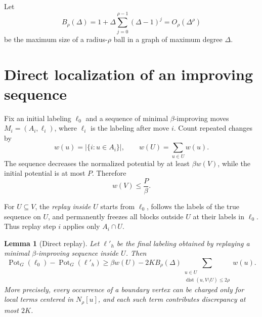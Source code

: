 \documentclass[11pt]{article}
\newtheorem{lemma}[theorem]{Lemma}
\theoremstyle{definition}
\theoremstyle{remark}
\newcommand{\dist}{\operatorname{dist}}
\newcommand{\Pot}{\operatorname{Pot}}
\newcommand{\N}{N}
\begin{document}
Let
\begin{equation}\label{eq:ballsize}
  B_\rho(\Delta)=1+\Delta\sum_{j=0}^{\rho-1}(\Delta-1)^j
  =O_\rho(\Delta^\rho)
\end{equation}
be the maximum size of a radius-$\rho$ ball in a graph of maximum degree $\Delta$.

\section{Direct localization of an improving sequence}

Fix an initial labeling $\ell_0$ and a sequence of minimal $\beta$-improving moves
$M_i=(A_i,\ell_i)$, where $\ell_i$ is the labeling after move $i$.  Count repeated
changes by
\[
  w(u)=|\{i:u\in A_i\}|,
  \qquad w(U)=\sum_{u\in U}w(u).
\]
The sequence decreases the normalized potential by at least $\beta w(V)$, while the
initial potential is at most $P$.  Therefore
\begin{equation}\label{eq:totalmass}
  w(V)\leq \frac{P}{\beta}.
\end{equation}

For $U\subseteq V$, the \emph{replay inside $U$} starts from $\ell_0$, follows the
labels of the true sequence on $U$, and permanently freezes all blocks outside $U$
at their labels in $\ell_0$.  Thus replay step $i$ applies only $A_i\cap U$.

\begin{lemma}[Direct replay]\label{lem:replay}
Let $\ell'_h$ be the final labeling obtained by replaying a minimal
$\beta$-improving sequence inside $U$.  Then
\[
 \Pot_G(\ell_0)-\Pot_G(\ell'_h)
 \geq
 \beta w(U)-2K B_\rho(\Delta)
 \sum_{\substack{u\in U\\ \dist(u,V\setminus U)\leq 2\rho}}w(u).
\]
More precisely, every occurrence of a boundary vertex can be charged only for local
terms centered in $\N_\rho[u]$, and each such term contributes discrepancy at most
$2K$.
\end{lemma}
\end{document}
